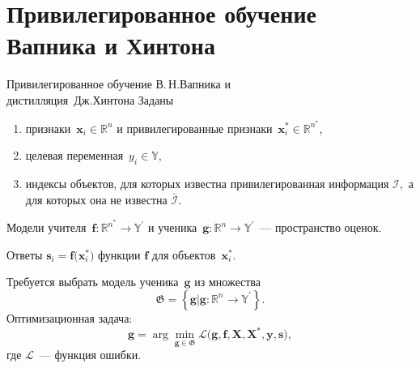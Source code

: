 \documentclass[10pt,pdf,hyperref={unicode}]{beamer}
\begin{document}
\section{Привилегированное обучение Вапника и Хинтона}
\begin{frame}{Привилегированное обучение {\color{red}В.\,Н.\;Вапника\footnotemark} и \\ \hfill\hfill\hfill\hfill\hfill дистилляция~{\color{blue}Дж.\;Хинтона\footnotemark}}
Заданы
\begin{enumerate}[1)]
    \item признаки~$\mathbf{x}_i \in \mathbb{R}^{n}$ и привилегированные признаки~$\mathbf{x}^*_i \in \mathbb{R}^{n^*}$,
    \item целевая переменная~$y_i \in \mathbb{Y}$,
    \item индексы объектов, для которых известна привилегированная информация $\mathcal{I},$ а для которых она не известна $\bar{\mathcal{I}}$.
\end{enumerate}

Модели учителя~$\mathbf{f}:\mathbb{R}^{n^*} \to \mathbb{Y}^\prime$ и ученика~$\mathbf{g}:\mathbb{R}^{n} \to \mathbb{Y}^\prime$~--- пространство оценок.

Ответы $\mathbf{s}_i = \mathbf{f}\bigr(\mathbf{x}_i^*\bigr)$ функции $\mathbf{f}$ для объектов~$\mathbf{x}^*_i$.

\bigskip

Требуется выбрать модель ученика~$\mathbf{g}$ из множества
\[
	\mathfrak{G} = \left\{\mathbf{g}| \mathbf{g}:\mathbb{R}^{n} \to \mathbb{Y}^\prime\right\}.
\]
Оптимизационная задача:
\[
	\mathbf{g} = \arg\min_{\mathbf{g} \in \mathfrak{G}} \mathcal{L}\bigr(\mathbf{g}, \mathbf{f}, \mathbf{X}, \mathbf{X}^{*}, \mathbf{y},\mathbf{s}\bigr),
\]
где $\mathcal{L}$~--- функция ошибки.

\bigskip
{}
\end{frame}

\end{document}
